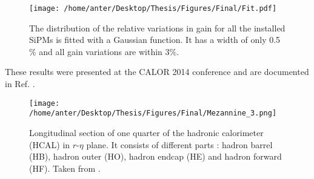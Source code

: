 \begin{figure}[!h]
\begin{center}
\texttt{[image: /home/anter/Desktop/Thesis/Figures/Final/Fit.pdf]}
\vspace*{4mm}
\caption{The distribution of the relative variations in gain for all the installed SiPMs is fitted with a Gaussian function. It has a width of only 0.5 \% and all gain variations are within 3\%.}
\label{fig:gain2}
\end{center}
\end{figure}
These results were presented at the CALOR 2014 conference \cite{Kunsken:2015zla} and are documented in Ref. \cite{DN}.

\begin{figure}[!h]
\begin{center}
\vspace*{3mm} 
\hspace*{-5mm}
\texttt{[image: /home/anter/Desktop/Thesis/Figures/Final/Mezannine\_3.png]}\\
\vspace*{4mm}
\caption[Longitudinal section of one quarter of the hadronic calorimeter (HCAL) in $r$-$\eta$ plane.]{Longitudinal section of one quarter of the hadronic calorimeter (HCAL) in $r$-$\eta$ plane. It consists of different parts : hadron barrel (HB), hadron outer (HO), hadron endcap (HE) and hadron forward (HF). Taken from \cite{Chatrchyan:2008aa}.}
\label{fig:mez}
\end{center}
\end{figure}

